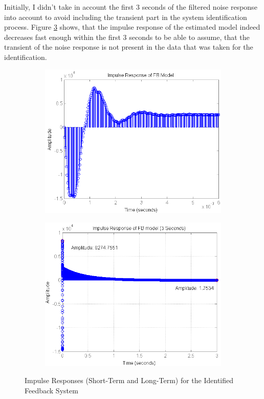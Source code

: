 Initially, I didn't take in account the first 3 seconds of the filtered noise response into account to avoid including the transient part in the system identification process. Figure \ref{fig:impulse_FB_3sec} shows, that the impulse response of the estimated model indeed decreases fast enough within the first 3 seconds to be able to assume, that the transient of the noise response is not present in the data that was taken for the identification.\\

\begin{figure}[h]
\centering
\begin{subfigure}[b]{0.5\textwidth}
\includegraphics[width=1.0\textwidth]{pics/impulse_FB}
\caption{}
\label{fig:impulse_FB}
\end{subfigure}\;\begin{subfigure}[b]{0.5\textwidth}
\includegraphics[width=1.0\textwidth]{pics/impulse_FB_3sec}
\caption{}
\label{fig:impulse_FB_3sec}
\end{subfigure}
\caption{Impulse Responses (Short-Term and Long-Term) for the Identified Feedback System}
\end{figure}

